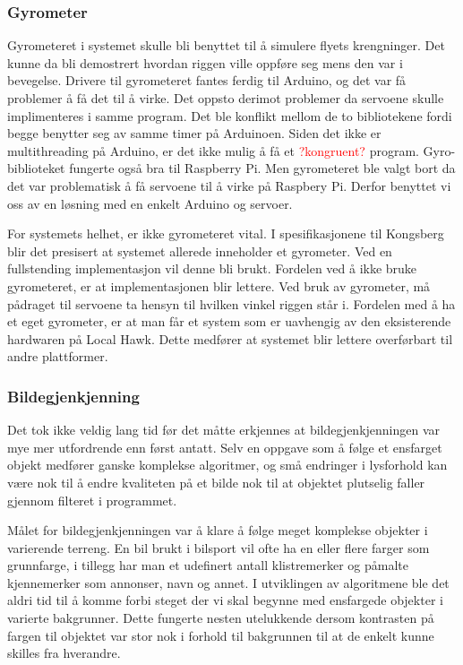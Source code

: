 \subsubsection{Gyrometer}
Gyrometeret i systemet skulle bli benyttet til å simulere flyets krengninger. Det kunne da bli demostrert hvordan riggen ville oppføre seg mens den var i bevegelse. Drivere til gyrometeret fantes ferdig til Arduino, og det var få problemer å få det til å virke. Det oppsto derimot problemer da servoene skulle implimenteres i samme program. Det ble konflikt mellom de to bibliotekene fordi begge benytter seg av samme timer på Arduinoen. Siden det ikke er multithreading på Arduino, er det ikke mulig å få et \textcolor{red}{?kongruent?} program. Gyro-biblioteket fungerte også bra til Raspberry Pi. Men gyrometeret ble valgt bort da det var problematisk å få servoene til å virke på Raspbery Pi. Derfor benyttet vi oss av en løsning med en enkelt Arduino og servoer. 

For systemets helhet, er ikke gyrometeret vital. I spesifikasjonene til Kongsberg blir det presisert at systemet allerede inneholder et gyrometer. Ved en fullstending implementasjon vil denne bli brukt. Fordelen ved å ikke bruke gyrometeret, er at implementasjonen blir lettere. Ved bruk av gyrometer, må pådraget til servoene ta hensyn til hvilken vinkel riggen står i. Fordelen med å ha et eget gyrometer, er at man får et system som er uavhengig av den eksisterende hardwaren på Local Hawk. Dette medfører at systemet blir lettere overførbart til andre plattformer.

\subsubsection{Bildegjenkjenning}

Det tok ikke veldig lang tid før det måtte erkjennes at bildegjenkjenningen var mye mer utfordrende enn først antatt. Selv en oppgave som å følge et ensfarget objekt medfører ganske komplekse algoritmer, og små endringer i lysforhold kan være nok til å endre kvaliteten på et bilde nok til at objektet plutselig faller gjennom filteret i programmet.

Målet for bildegjenkjenningen var å klare å følge meget komplekse objekter i varierende terreng. En bil brukt i bilsport vil ofte ha en eller flere farger som grunnfarge, i tillegg har man et udefinert antall klistremerker og påmalte kjennemerker som annonser, navn og annet. I utviklingen av algoritmene ble det aldri tid til å komme forbi steget der vi skal begynne med ensfargede objekter i varierte bakgrunner. Dette fungerte nesten utelukkende dersom kontrasten på fargen til objektet var stor nok i forhold til bakgrunnen til at de enkelt kunne skilles fra hverandre.


